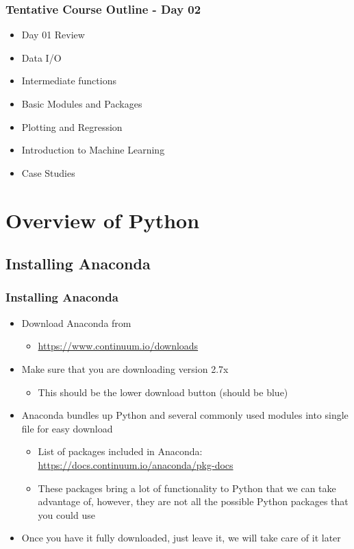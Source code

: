 \documentclass[mini frame in current subsection]{beamer}
\begin{document}
		
		\begin{frame}
			\frametitle{Tentative Course Outline - Day 02}
			\begin{itemize}
				\item  Day 01 Review
				\item  Data I/O
				\item  Intermediate functions
				\item  Basic Modules and Packages
				\item  Plotting and Regression
				\item  Introduction to Machine Learning
				\item  Case Studies
			\end{itemize}
		\end{frame}

\section{Overview of Python}
	\subsection{Installing Anaconda}
	
		\begin{frame}
			\frametitle{Installing Anaconda}
			\begin{itemize}
				\vfill \item Download Anaconda from 
					\begin{itemize}
						\item \url{https://www.continuum.io/downloads}
					\end{itemize}
				\vfill \item  Make sure that you are downloading version 2.7x
					\begin{itemize}
						\item This should be the lower download button (should be blue)
					\end{itemize}
				\vfill \item  Anaconda bundles up Python and several commonly used modules into single file for easy download
					\begin{itemize}
						\item  List of packages included in Anaconda: \url{https://docs.continuum.io/anaconda/pkg-docs}
						\item  These packages bring a lot of functionality to Python that we can take advantage of, however, they are not all the possible Python packages that you could use
					\end{itemize}
				\vfill \item  Once you have it fully downloaded, just leave it, we will take care of it later
			\end{itemize}
		\end{frame}
		
\end{document}
